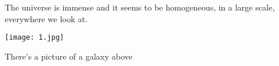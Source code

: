 \documentclass{article}
\begin{document}
The universe is immense and it seems to be homogeneous, 
in a large scale, everywhere we look at.
 
\texttt{[image: 1.jpg]}
 
There's a picture of a galaxy above
\end{document}
